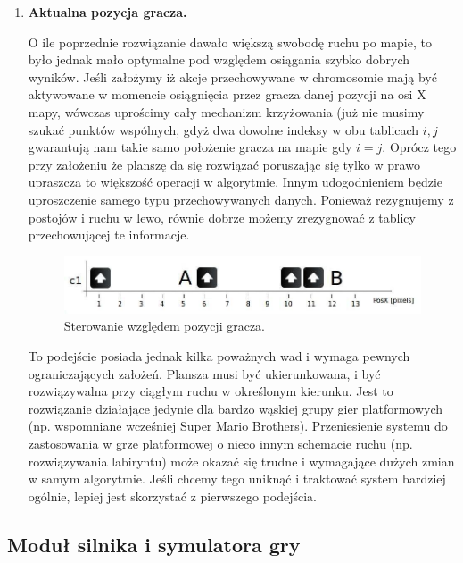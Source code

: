\begin{par}
\begin{enumerate}
\begin{par}
	\end{par}
	\item
	{\bf Aktualna pozycja gracza.}
	\begin{par}
		O ile poprzednie rozwiązanie dawało większą swobodę ruchu po mapie, to było jednak mało optymalne pod względem osiągania szybko dobrych wyników.
		Jeśli założymy iż akcje przechowywane w chromosomie mają być aktywowane w momencie osiągnięcia przez gracza danej pozycji na osi X mapy, wówczas uprościmy cały mechanizm krzyżowania (już nie musimy szukać punktów wspólnych, gdyż dwa dowolne indeksy w obu tablicach $i,j$ gwarantują nam takie samo położenie gracza na mapie gdy $i=j$.
		Oprócz tego przy założeniu że planszę da się rozwiązać poruszając się tylko w prawo upraszcza to większość operacji w algorytmie.
		Innym udogodnieniem będzie uproszczenie samego typu przechowywanych danych. Ponieważ rezygnujemy z postojów i ruchu w lewo, równie dobrze możemy zrezygnować z tablicy przechowującej te informacje.

		\begin{par}
		\begin{figure}[!h]
		\centering
		\includegraphics[width=\textwidth]{obrazki/sterowanie2.jpg}
		\caption{Sterowanie względem pozycji gracza.}
		\label{fig:sterowanie2}
		\end{figure}
		\end{par}

		To podejście posiada jednak kilka poważnych wad i wymaga pewnych ograniczających założeń.
		Plansza musi być ukierunkowana, i być rozwiązywalna przy ciągłym ruchu w określonym kierunku.
		Jest to rozwiązanie działające jedynie dla bardzo wąskiej grupy gier platformowych (np. wspomniane wcześniej Super Mario Brothers).
		Przeniesienie systemu do zastosowania w grze platformowej o nieco innym schemacie ruchu (np. rozwiązywania labiryntu) może okazać się trudne i wymagające dużych zmian w samym algorytmie.
		Jeśli chcemy tego uniknąć i traktować system bardziej ogólnie, lepiej jest skorzystać z pierwszego podejścia.
	\end{par}
	\end{enumerate}
	\FloatBarrier
\end{par}
\subsection{Moduł silnika i symulatora gry}

